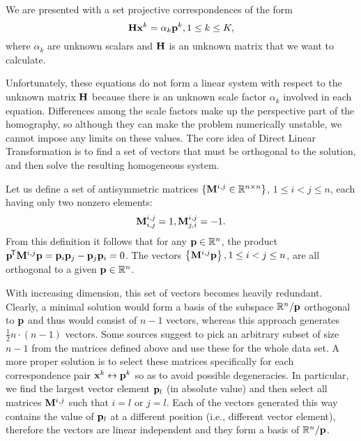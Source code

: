 We are presented with a set projective correspondences of the form
$$\mathbf{H} \mathbf{x}^k = \alpha_k \mathbf{p}^k, 1 \leq k \leq K,$$
where $\alpha_k$ are unknown scalars and $\mathbf{H}$ is an unknown matrix that we want to calculate.

Unfortunately, these equations do not form a linear system with respect to the unknown matrix $\mathbf{H}$ because there is an unknown scale factor $\alpha_k$ involved in each equation.
Differences among the scale factors make up the perspective part of the homography, so although they can make the problem numerically unstable, we cannot impose any limits on these values.
The core idea of Direct Linear Transformation is to find a set of vectors that must be orthogonal to the solution, and then solve the resulting homogeneous system.

Let us define a set of antisymmetric matrices $\{\mathbf{M}^{i, j} \in \mathbb{R}^{n \times n}\}$, $1 \leq i < j \leq n$, each having only two nonzero elements:
$$\mathbf{M}^{i, j}_{i, j} = 1,
\mathbf{M}^{i, j}_{j, i} = -1.$$
From this definition it follows that for any $\mathbf{p} \in \mathbb{R}^n$, the product $\mathbf{p}^{\!\mathsf{T}} \mathbf{M}^{i, j} \mathbf{p} = \mathbf{p}_{i} \mathbf{p}_{j} - \mathbf{p}_{j} \mathbf{p}_{i} = 0$.
The vectors $\left\{ \mathbf{M}^{i, j} \mathbf{p} \right\}, 1 \leq i < j \leq n$, are all orthogonal to a given $\mathbf{p} \in \mathbb{R}^n$.

With increasing dimension, this set of vectors becomes heavily redundant.
Clearly, a minimal solution would form a basis of the subspace $\mathbb{R}^n / \mathbf{p}$ orthogonal to $\mathbf{p}$ and thus would consist of $n - 1$ vectors, whereas this approach generates $\frac {1} {2} n \cdot (n - 1)$ vectors.
Some sources\cite{MVG} suggest to pick an arbitrary subset of size $n - 1$ from the matrices defined above and use these for the whole data set.
A more proper solution is to select these matrices specifically for each correspondence pair $\mathbf{x}^k \leftrightarrow \mathbf{p}^k$ so as to avoid possible degeneracies.
In particular, we find the largest vector element $\mathbf{p}_l$ (in absolute value) and then select all matrices $\mathbf{M}^{i, j}$ such that $i = l$ or $j = l$.
Each of the vectors generated this way contains the value of $\mathbf{p}_l$ at a different position (i.e., different vector element), therefore the vectors are linear independent and they form a basis of $\mathbb{R}^n / \mathbf{p}$.

